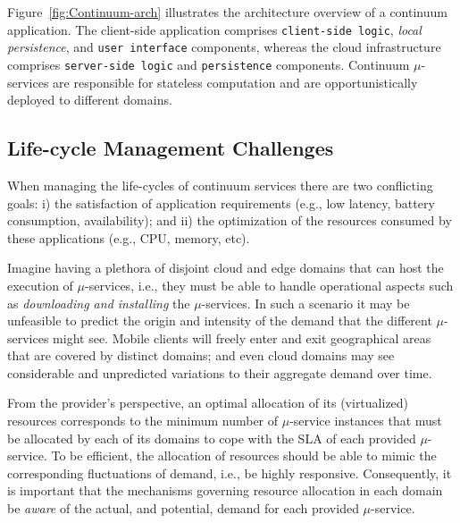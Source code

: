 Figure~\ref{fig:Continuum-arch} illustrates the architecture overview of a continuum application. The client-side application comprises \texttt{client-side logic}, \textit{local persistence}, and \texttt{user interface} components, whereas the cloud infrastructure comprises \texttt{server-side logic} and \texttt{persistence} components. Continuum $\mu$-services are responsible for stateless computation and are opportunistically deployed to different domains.

\subsection{Life-cycle Management Challenges}


When managing the life-cycles of continuum services there are two conflicting goals: i) the satisfaction of application requirements (e.g., low latency, battery consumption, availability); and ii) the optimization of the resources consumed by these applications (e.g., CPU, memory, etc). 

Imagine having a plethora of disjoint cloud and edge domains that can host the execution of $\mu$-services, i.e., they must be able to handle operational aspects such as \textit{downloading and installing} the $\mu$-services. In such a scenario it may be unfeasible to predict the origin and intensity of the demand that the different $\mu$-services might see. Mobile clients will freely enter and exit geographical areas that are covered by distinct domains; and even cloud domains may see considerable and unpredicted variations to their aggregate demand over time. 

From the provider's perspective, an optimal allocation of its (virtualized) resources corresponds to the minimum number of $\mu$-service instances that must be allocated by each of its domains to cope with the SLA of each provided $\mu$-service. To be efficient, the allocation of resources should be able to mimic the corresponding fluctuations of demand, i.e., be highly responsive. Consequently, it is important that the mechanisms governing resource allocation in each domain be \textit{aware} of the actual, and potential, demand for each provided $\mu$-service. 

